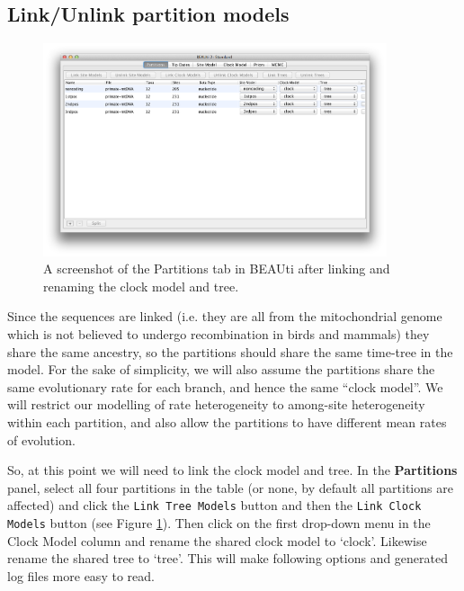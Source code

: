 \documentclass[11pt]{article}
\theoremstyle{plain}%
\theoremstyle{definition}
\theoremstyle{remark}
\begin{document}
%
%

\subsection*{Link/Unlink partition models}

\begin{figure}
\centering	
\includegraphics[width=0.9\textwidth]{figures/BEAUti_DataPartitions_final}
\caption{A screenshot of the Partitions tab in BEAUti after linking and renaming the clock model and tree.}
\label{fig:BEAUti_DataPartitions_final}
\end{figure}

Since the sequences are linked (i.e. they are all from the mitochondrial genome
which is not believed to undergo recombination in birds and mammals) they
share the same ancestry, so the partitions should share the same time-tree in
the model. For the sake of simplicity, we will also assume the partitions share
the same evolutionary rate for each branch, and hence the same ``clock model''.
We will restrict our modelling of rate heterogeneity to among-site heterogeneity
within each partition, and also allow the partitions to have different mean rates of evolution. 

So, at this point we will need to link the clock model and tree. In the {\bf Partitions} panel, select all four partitions in the table (or none, by default all partitions are affected) and click the \texttt{Link Tree Models} button and then the \texttt{Link Clock Models} button (see Figure \ref{fig:BEAUti_DataPartitions_final}). Then click on the first drop-down menu in the Clock Model column and rename the shared clock model to `clock'. Likewise rename the shared tree to `tree'. This will make following options and generated log files more easy to read.
\end{document}
